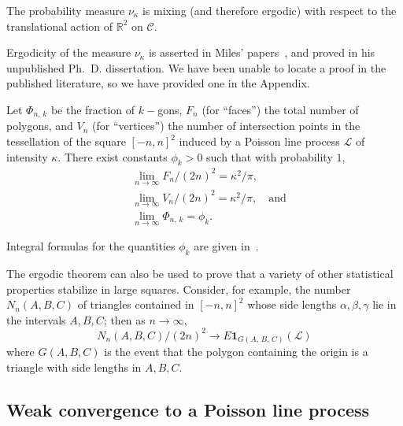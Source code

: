 \documentclass[AHL, Unicode, longabstracts, published]{cedram}
\newcommand{\zz}[1]{\mathbb #1}
\begin{document}
\begin{prop}\label{proposition:ergodicity-plp}
The probability measure $\nu_{\kappa}$ is mixing (and therefore ergodic) with respect to the translational action of $\zz{R}^{2}$ on $\mathcal{C}$.
\end{prop}

\begin{rema}\label{remark:kendall}
Ergodicity of the measure $\nu_{\kappa}$ is asserted in Miles' papers~\cite{miles:pnas1,miles:pnas2}, and proved in his unpublished Ph.~D. dissertation. We have been unable to locate a proof in the published literature, so we have provided one in the Appendix.
\end{rema}

\begin{coro}\label{corollary:poly-freqs}
Let $\Phi _{n,\,k}$ be the fraction of $k-$gons, $F_{n}$ (for ``faces'') the total number of polygons, and $V_{n}$ (for ``vertices'') the number of intersection points in the tessellation of the square $[-n,n]^{2}$ induced by a Poisson line process $\mathcal{L}$ of intensity $\kappa$. There exist constants $\phi _{k}>0$ such that with probability $1$,
\begin{align}\label{eq:poly-freqs}
&\lim_{n \rightarrow \infty} F_{n}/ (2n)^{2}=\kappa^{2} /\pi,\\\label{eq:vertex-freqs}
&\lim_{n \rightarrow \infty} V_{n}/ (2n)^{2}=\kappa^{2}/\pi, \quad \text{and}\\\label{eq:kgonFracs}
&\lim_{n \rightarrow \infty} \Phi _{n,\,k}=\phi _{k}.
\end{align}
\end{coro}

Integral formulas for the quantities $\phi_k$ are given in~\cite{Calka}.

The ergodic theorem can also be used to prove that a variety of other statistical properties stabilize in large squares. Consider, for example, the number $N_{n} (A,B,C)$ of triangles contained in $[-n,n]^{2}$ whose side lengths $\alpha,\beta,\gamma$ lie in the intervals $A,B,C$; then as $n
\rightarrow \infty$,
\[
N_{n} (A,B,C)/ (2n)^{2} \longrightarrow E \mathbf{1}_{G (A,\,B,\,C)} (\mathcal{L})
\]
where $G (A,B,C)$ is the event that the polygon containing the origin is a triangle with side lengths in $A,B,C$.


\subsection{Weak convergence to a Poisson line process}\label{ssec:poissonApprox}
\end{document}

